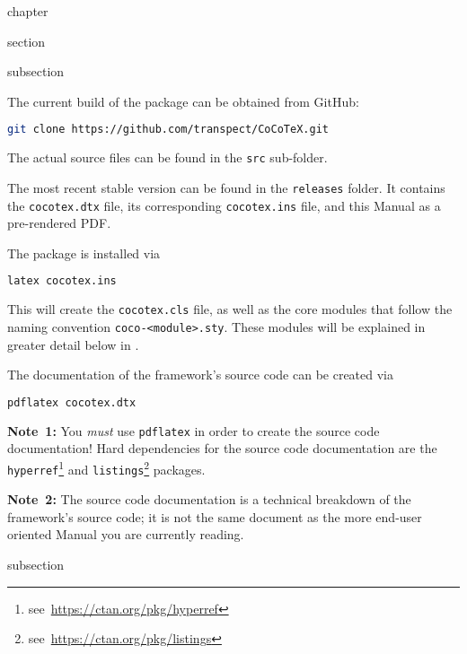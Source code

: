 \begin{heading}{chapter}
\end{heading}

\begin{heading}{section}
\end{heading}

\begin{heading}{subsection}
\end{heading}

The current build of the package can be obtained from GitHub:
\begin{lstlisting}[style=tex,language=bash]
git clone https://github.com/transpect/CoCoTeX.git
\end{lstlisting}
The actual source files can be found in the \lstinline{src} sub-folder.

The most recent stable version can be found in the
\lstinline{releases} folder. It contains the \lstinline{cocotex.dtx}
file, its corresponding \lstinline{cocotex.ins} file, and this
Manual as a pre-rendered PDF.

The package is installed via
\begin{lstlisting}[style=tex,language=bash]
latex cocotex.ins
\end{lstlisting}
This will create the \lstinline{cocotex.cls} file, as well as the core
modules that follow the naming convention
\lstinline{coco-<module>.sty}. These modules will be explained in
greater detail below in .

The documentation of the framework's source code can be created via
\begin{lstlisting}[style=tex,language=bash]
pdflatex cocotex.dtx
\end{lstlisting}
\textbf{Note~1:} You \textit{must} use \lstinline{pdflatex} in order
to create the source code documentation! Hard dependencies for the
source code documentation are the
\lstinline{hyperref}\footnote{see~\url{https://ctan.org/pkg/hyperref}}
and
\lstinline{listings}\footnote{see~\url{https://ctan.org/pkg/listings}}
packages.

\textbf{Note~2:} The source code documentation is a technical breakdown
of the framework's source code; it is not the same document as the
more end-user oriented Manual you are currently reading.

\begin{heading}{subsection}
\end{heading}

